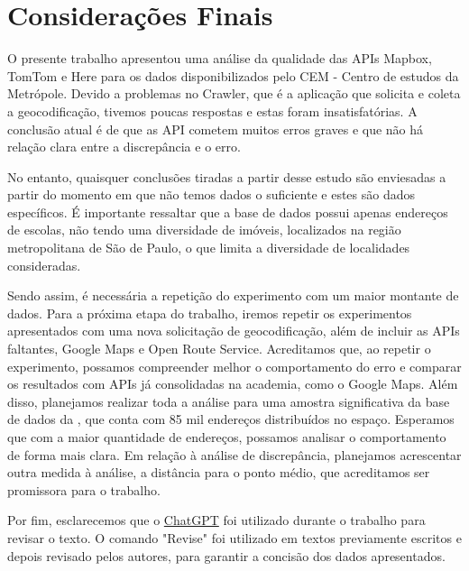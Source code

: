 \chapter{Considerações Finais} \label{consideracoes}

O presente trabalho apresentou uma análise da qualidade das APIs Mapbox, TomTom e Here para os dados disponibilizados pelo CEM - Centro de estudos da Metrópole. Devido a problemas no Crawler, que é a aplicação que solicita e coleta a geocodificação, tivemos poucas respostas e estas foram insatisfatórias. A conclusão atual é de que as API cometem muitos erros graves e que não há relação clara entre a discrepância e o erro. 

No entanto, quaisquer conclusões tiradas a partir desse estudo são enviesadas a partir do momento em que não temos dados o suficiente e estes são dados específicos. É importante ressaltar que a base de dados possui apenas endereços de escolas, não tendo uma diversidade de imóveis, localizados na região metropolitana de São de Paulo, o que limita a diversidade de localidades consideradas.

Sendo assim, é necessária a repetição do experimento com um maior montante de dados. Para a próxima etapa do trabalho, iremos repetir os experimentos apresentados com uma nova solicitação de geocodificação, além de incluir as APIs faltantes, Google Maps e Open Route Service. Acreditamos que, ao repetir o experimento, possamos compreender melhor o comportamento do erro e comparar os resultados com APIs já consolidadas na academia, como o Google Maps. Além disso, planejamos realizar toda a análise para uma amostra significativa da base de dados da \cite{Prodabel}, que conta com 85 mil endereços distribuídos no espaço. Esperamos que com a maior quantidade de endereços, possamos analisar o comportamento de forma mais clara. Em relação à análise de discrepância, planejamos acrescentar outra medida à análise, a distância para o ponto médio, que acreditamos ser promissora para o trabalho.

Por fim, esclarecemos que o \href{https://chat.openai.com/auth/login?next=%2F}{ChatGPT} foi utilizado durante o trabalho para revisar o texto. O comando "Revise" foi utilizado em textos previamente escritos e depois revisado pelos autores, para garantir a concisão dos dados apresentados. 
 
